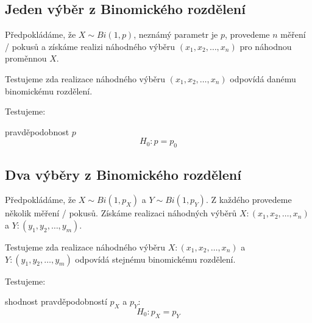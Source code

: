 \subsection{Jeden výběr z Binomického rozdělení}

\begin{compactitem}
    \item Předpokládáme, že $X \sim Bi(1, p)$, neznámý parametr je $p$, provedeme $n$  měření / pokusů a získáme realizi náhodného výběru $(x_1, x_2, \ldots, x_n)$ pro náhodnou proměnnou $X$.

    \item Testujeme zda realizace náhodného výběru $(x_1, x_2, \ldots, x_n)$ odpovídá danému binomickému rozdělení.

    \item Testujeme: \begin{compactitem}
        \item pravděpodobnost $p$
        $$ H_0 : p = p_0 $$
    \end{compactitem}
\end{compactitem}

\subsection{Dva výběry z Binomického rozdělení}

\begin{compactitem}
    \item Předpokládáme, že $X \sim Bi(1, p_X)$ a $Y \sim Bi(1, p_Y)$. Z každého provedeme několik měření / pokusů. Získáme realizaci náhodných výběrů $X: (x_1, x_2, \ldots, x_n)$ a $Y: (y_1, y_2, \ldots, y_m)$.

    \item Testujeme zda realizace náhodného výběru $X : (x_1, x_2, \ldots, x_n)$ a $Y: (y_1, y_2, \ldots, y_m)$ odpovídá stejnému binomickému rozdělení.

    \item Testujeme: \begin{compactitem}
        \item shodnost pravděpodobností $p_X$ a $p_Y$:
        $$ H_0 : p_X = p_Y $$
    \end{compactitem}
\end{compactitem}
